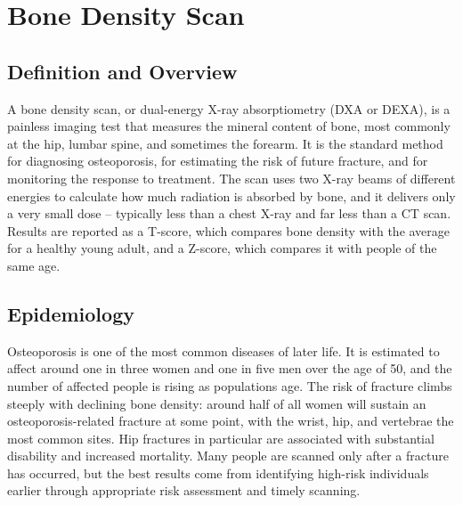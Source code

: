 \chapter{Bone Density Scan}

\section*{Definition and Overview}
A bone density scan, or dual-energy X-ray absorptiometry (DXA or DEXA), is a painless imaging test that measures the mineral content of bone, most commonly at the hip, lumbar spine, and sometimes the forearm. It is the standard method for diagnosing osteoporosis, for estimating the risk of future fracture, and for monitoring the response to treatment. The scan uses two X-ray beams of different energies to calculate how much radiation is absorbed by bone, and it delivers only a very small dose -- typically less than a chest X-ray and far less than a CT scan. Results are reported as a T-score, which compares bone density with the average for a healthy young adult, and a Z-score, which compares it with people of the same age.

\section*{Epidemiology}
Osteoporosis is one of the most common diseases of later life. It is estimated to affect around one in three women and one in five men over the age of 50, and the number of affected people is rising as populations age. The risk of fracture climbs steeply with declining bone density: around half of all women will sustain an osteoporosis-related fracture at some point, with the wrist, hip, and vertebrae the most common sites. Hip fractures in particular are associated with substantial disability and increased mortality. Many people are scanned only after a fracture has occurred, but the best results come from identifying high-risk individuals earlier through appropriate risk assessment and timely scanning.

